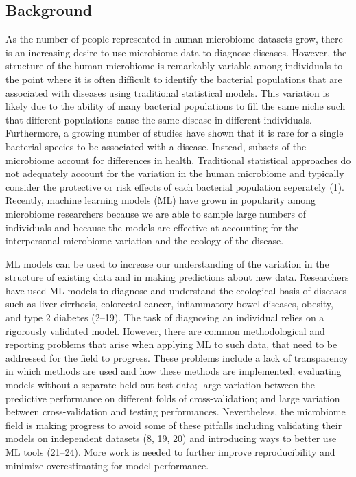 \documentclass[11pt,]{article}
\begin{document}
\newpage

\subsection{Background}\label{background}

As the number of people represented in human microbiome datasets grow,
there is an increasing desire to use microbiome data to diagnose
diseases. However, the structure of the human microbiome is remarkably
variable among individuals to the point where it is often difficult to
identify the bacterial populations that are associated with diseases
using traditional statistical models. This variation is likely due to
the ability of many bacterial populations to fill the same niche such
that different populations cause the same disease in different
individuals. Furthermore, a growing number of studies have shown that it
is rare for a single bacterial species to be associated with a disease.
Instead, subsets of the microbiome account for differences in health.
Traditional statistical approaches do not adequately account for the
variation in the human microbiome and typically consider the protective
or risk effects of each bacterial population seperately (1). Recently,
machine learning models (ML) have grown in popularity among microbiome
researchers because we are able to sample large numbers of individuals
and because the models are effective at accounting for the interpersonal
microbiome variation and the ecology of the disease.

ML models can be used to increase our understanding of the variation in
the structure of existing data and in making predictions about new data.
Researchers have used ML models to diagnose and understand the
ecological basis of diseases such as liver cirrhosis, colorectal cancer,
inflammatory bowel diseases, obesity, and type 2 diabetes (2--19). The
task of diagnosing an individual relies on a rigorously validated model.
However, there are common methodological and reporting problems that
arise when applying ML to such data, that need to be addressed for the
field to progress. These problems include a lack of transparency in
which methods are used and how these methods are implemented; evaluating
models without a separate held-out test data; large variation between
the predictive performance on different folds of cross-validation; and
large variation between cross-validation and testing performances.
Nevertheless, the microbiome field is making progress to avoid some of
these pitfalls including validating their models on independent datasets
(8, 19, 20) and introducing ways to better use ML tools (21--24). More
work is needed to further improve reproducibility and minimize
overestimating for model performance.
\end{document}
